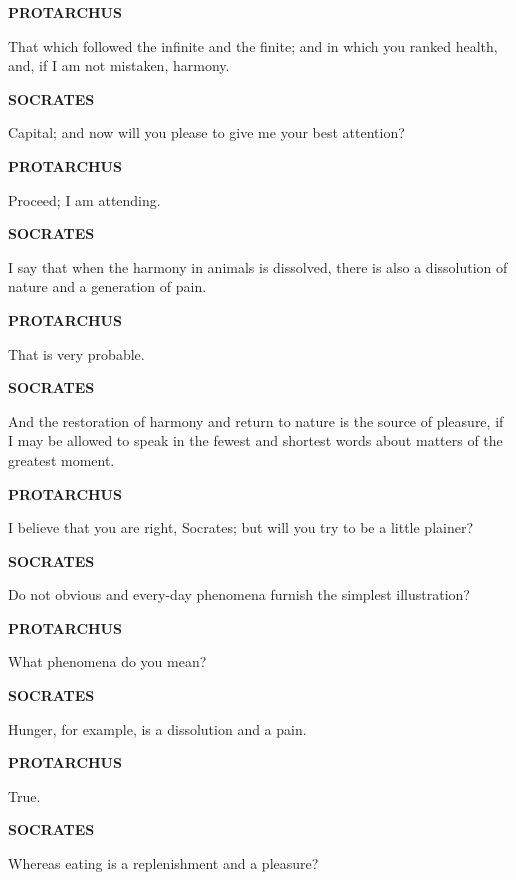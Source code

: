 \documentclass[11pt,letter]{article}
\begin{document}
\par \textbf{PROTARCHUS}
\par   That which followed the infinite and the finite; and in which you ranked health, and, if I am not mistaken, harmony.

\par \textbf{SOCRATES}
\par   Capital; and now will you please to give me your best attention?

\par \textbf{PROTARCHUS}
\par   Proceed; I am attending.

\par \textbf{SOCRATES}
\par   I say that when the harmony in animals is dissolved, there is also a dissolution of nature and a generation of pain.

\par \textbf{PROTARCHUS}
\par   That is very probable.

\par \textbf{SOCRATES}
\par   And the restoration of harmony and return to nature is the source of pleasure, if I may be allowed to speak in the fewest and shortest words about matters of the greatest moment.

\par \textbf{PROTARCHUS}
\par   I believe that you are right, Socrates; but will you try to be a little plainer?

\par \textbf{SOCRATES}
\par   Do not obvious and every-day phenomena furnish the simplest illustration?

\par \textbf{PROTARCHUS}
\par   What phenomena do you mean?

\par \textbf{SOCRATES}
\par   Hunger, for example, is a dissolution and a pain.

\par \textbf{PROTARCHUS}
\par   True.

\par \textbf{SOCRATES}
\par   Whereas eating is a replenishment and a pleasure?
\end{document}
